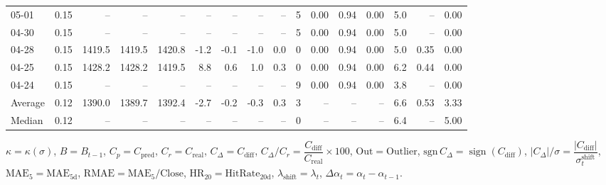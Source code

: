 \begin{threeparttable}
{\begin{tabular}{lrrrrrrrrrrrrrrr}
  05-01 &     0.15 &     -- &     -- &     -- &         -- &             -- &                       -- &                  -- &              5 &       0.00 &      0.94 &           0.00 &              5.0 &              -- &                   0.00 \\
  04-30 &     0.15 &     -- &     -- &     -- &         -- &             -- &                       -- &                  -- &              5 &       0.00 &      0.94 &           0.00 &              5.0 &              -- &                   0.00 \\
  04-28 &     0.15 & 1419.5 & 1419.5 & 1420.8 &       -1.2 &           -0.1 &                     -1.0 &                 0.0 &              0 &       0.00 &      0.94 &           0.00 &              5.0 &            0.35 &                   0.00 \\
  04-25 &     0.15 & 1428.2 & 1428.2 & 1419.5 &        8.8 &            0.6 &                      1.0 &                 0.3 &              0 &       0.00 &      0.94 &           0.00 &              6.2 &            0.44 &                   0.00 \\
  04-24 &     0.15 &     -- &     -- &     -- &         -- &             -- &                       -- &                  -- &              9 &       0.00 &      0.94 &           0.00 &              3.8 &              -- &                   0.00 \\
Average &     0.12 & 1390.0 & 1389.7 & 1392.4 &       -2.7 &           -0.2 &                     -0.3 &                 0.3 &              3 &         -- &        -- &             -- &              6.6 &            0.53 &                   3.33 \\
 Median &     0.12 &     -- &     -- &     -- &         -- &             -- &                       -- &                  -- &              0 &         -- &        -- &             -- &              6.4 &              -- &                   5.00 \\
\bottomrule
\end{tabular}
}
\begin{tablenotes}\footnotesize
\item $\kappa=\kappa(\sigma)$, $B=B_{t-1}$, $C_p=C_{\text{pred}}$, $C_r=C_{\text{real}}$, $C_\Delta=C_{\text{diff}}$, $C_\Delta/C_r=\dfrac{C_{\text{diff}}}{C_{\text{real}}}\times100$, $\mathrm{Out}=\text{Outlier}$, $\mathrm{sgn}\,C_\Delta=\operatorname{sign}(C_{\text{diff}})$, $|C_\Delta|/\sigma=\dfrac{|C_{\text{diff}}|}{\sigma_t^{\text{shift}}}$, $\mathrm{MAE}_5=\mathrm{MAE}_{5\text{d}}$, $\mathrm{RMAE}= \mathrm{MAE}_5 / \text{Close}$, $\mathrm{HR}_{20}=\mathrm{HitRate}_{20\text{d}}$, 
$\lambda_{\text{shift}}=\lambda_t$, 
$\Delta\alpha_t=\alpha_t-\alpha_{t-1}$.
\end{tablenotes}
\end{threeparttable}
\endgroup

